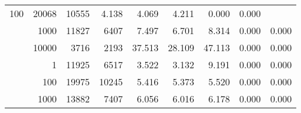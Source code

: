 \begin{table}
\begin{tabular}{rrrrrrrrr}
					\multirow{ 1 }{*}{ 100 } &
					
						
							    
							     20068  & 10555  
	                           & 4.138 & 4.069 & 4.211
	                           & 0.000 & 0.000  \\
	                
	            
					 &  
					 
					\multirow{ 1 }{*}{ 1000 } &
					
						
							    
							     11827  & 6407  
	                           & 7.497 & 6.701 & 8.314
	                           & 0.000 & 0.000  \\
	                
	            
					 &  
					 
					\multirow{ 1 }{*}{ 10000 } &
					
						
							    
							     3716  & 2193  
	                           & 37.513 & 28.109 & 47.113
	                           & 0.000 & 0.000  \\
	                
	            
	        
				\noalign{\smallskip}\hline
				\multirow{ 4 }{*}{ 250000 } &
				
					
					 
					\multirow{ 1 }{*}{ 1 } &
					
						
							    
							     11925  & 6517  
	                           & 3.522 & 3.132 & 9.191
	                           & 0.000 & 0.000  \\
	                
	            
					 &  
					 
					\multirow{ 1 }{*}{ 100 } &
					
						
							    
							     19975  & 10245  
	                           & 5.416 & 5.373 & 5.520
	                           & 0.000 & 0.000  \\
	                
	            
					 &  
					 
					\multirow{ 1 }{*}{ 1000 } &
					
						
							    
							     13882  & 7407  
	                           & 6.056 & 6.016 & 6.178
	                           & 0.000 & 0.000  \\
	                

\end{tabular}
\end{table}
